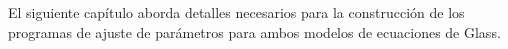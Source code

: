 El siguiente capítulo aborda detalles necesarios para la construcción de los programas de ajuste de parámetros para ambos modelos de ecuaciones de Glass.


